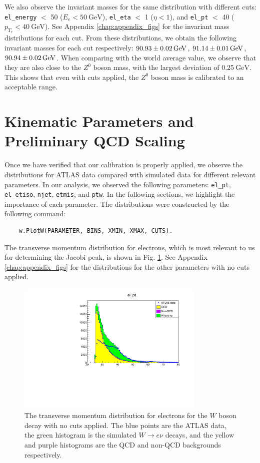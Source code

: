 \documentclass[a4paper]{report}
\numberwithin{equation}{section}
\begin{document}
We also observe the invariant masses for the same distribution with different cuts: \texttt{el\_energy} $<$ 50 ($E_e < \SI{50}{\giga\electronvolt}$), \texttt{el\_eta} $<$ 1 
($\eta < 1$), and \texttt{el\_pt} $<$ 40 ($p_{T_e} < \SI{40}{\giga\electronvolt}$). See Appendix \ref{chap:appendix_figs} for the 
invariant mass distributions for each cut. From these distributions, we obtain the following invariant masses for each cut 
respectively: 
$\SI{90.93 \pm 0.02}{\giga\electronvolt}$, $\SI{91.14 \pm 0.01}{\giga\electronvolt}$, $\SI{90.94 \pm 0.02}{\giga\electronvolt}$. 
When comparing with the world average value, we observe that they are also close to the $Z^0$ boson mass, with the largest deviation 
of $\SI{0.25}{\giga\electronvolt}$. This shows that even with cuts applied, the $Z^0$ boson mass is calibrated to an acceptable range. 

\section{Kinematic Parameters and Preliminary QCD Scaling}

Once we have verified that our calibration is properly applied, we observe the distributions for ATLAS data compared with 
simulated data for different relevant parameters. In our analysis, we observed the following parameters: 
\texttt{el\_pt}, \texttt{el\_etiso}, \texttt{njet}, \texttt{etmis}, and \texttt{ptw}. In the following sections, we highlight
the importance of each parameter. The distributions were constructed by the following command:
\begin{verbatim}
    w.PlotW(PARAMETER, BINS, XMIN, XMAX, CUTS).
\end{verbatim} 
The transverse momentum distribution for electrons, which is most relevant to us for determining the Jacobi peak, is shown 
in Fig. \ref{fig:elpt_nocuts}. See Appendix \ref{chap:appendix_figs} for the distributions for the other parameters with no cuts applied. \par 

\begin{figure}[htpb]
    \centering
    \includegraphics[width=0.8\textwidth]{elpt_nocuts.pdf}
    \caption{The transverse momentum distribution for electrons for the $W$ boson decay with no cuts applied. The blue points are the ATLAS data, 
    the green histogram is the simulated $W \rightarrow e\nu$ decays, and the yellow and purple histograms are the QCD and 
    non-QCD backgrounds respectively.}
    \label{fig:elpt_nocuts}
\end{figure}
\end{document}
